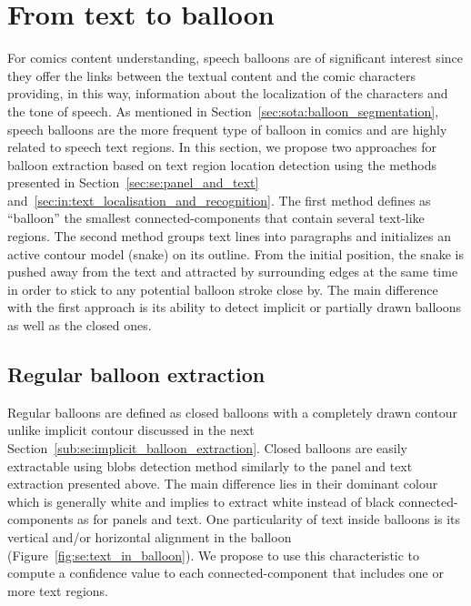 


\section{From text to balloon} %
\label{sec:se:from_text_to_balloon}
For comics content understanding, speech balloons are of significant interest since they offer the links between the textual content and the comic characters providing, in this way, information about the localization of the characters and the tone of speech. 
As mentioned in Section~\ref{sec:sota:balloon_segmentation}, speech balloons are the more frequent type of balloon in comics and are highly related to speech text regions.
In this section, we propose two approaches for balloon extraction based on text region location detection using the methods presented in Section~\ref{sec:se:panel_and_text} and~\ref{sec:in:text_localisation_and_recognition}.
The first method defines as ``balloon'' the smallest connected-components that contain several text-like regions.
The second method groups text lines into paragraphs and initializes an active contour model (snake) on its outline.
From the initial position, the snake is pushed away from the text and attracted by surrounding edges at the same time in order to stick to any potential balloon stroke close by.
The main difference with the first approach is its ability to detect implicit or partially drawn balloons as well as the closed ones.

\subsection{Regular balloon extraction} %
\label{sub:se:regular_balloon_extraction}
Regular balloons are defined as closed balloons with a completely drawn contour unlike implicit contour discussed in the next Section~\ref{sub:se:implicit_balloon_extraction}.
Closed balloons are easily extractable using blobs detection method similarly to the panel and text extraction presented above.
The main difference lies in their dominant colour which is generally white and implies to extract white instead of black connected-components as for panels and text.
One particularity of text inside balloons is its vertical and/or horizontal alignment in the balloon (Figure~\ref{fig:se:text_in_balloon}).
We propose to use this characteristic to compute a confidence value to each connected-component that includes one or more text regions.

